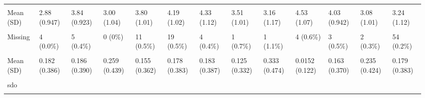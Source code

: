 \documentclass[
  single column]{article}
\begin{document}
\begin{landscape}
\begin{longtable}[t]{lllllllllllll}
\addlinespace
\cellcolor{gray!10}{rwa} & \cellcolor{gray!10}{} & \cellcolor{gray!10}{} & \cellcolor{gray!10}{} & \cellcolor{gray!10}{} & \cellcolor{gray!10}{} & \cellcolor{gray!10}{} & \cellcolor{gray!10}{} & \cellcolor{gray!10}{} & \cellcolor{gray!10}{} & \cellcolor{gray!10}{} & \cellcolor{gray!10}{} & \cellcolor{gray!10}{}\\
Mean (SD) & 2.88 (0.947) & 3.84 (0.923) & 3.00 (1.04) & 3.80 (1.01) & 4.19 (1.02) & 4.33 (1.12) & 3.51 (1.01) & 3.16 (1.17) & 4.53 (1.07) & 4.03 (0.942) & 3.08 (1.01) & 3.24 (1.12)\\
\cellcolor{gray!10}{Median [Min, Max]} & \cellcolor{gray!10}{2.83 [1.00, 7.00]} & \cellcolor{gray!10}{3.83 [1.00, 7.00]} & \cellcolor{gray!10}{2.82 [1.00, 6.50]} & \cellcolor{gray!10}{3.83 [1.00, 7.00]} & \cellcolor{gray!10}{4.17 [1.00, 7.00]} & \cellcolor{gray!10}{4.33 [1.00, 7.00]} & \cellcolor{gray!10}{3.50 [1.60, 5.50]} & \cellcolor{gray!10}{3.10 [1.00, 6.00]} & \cellcolor{gray!10}{4.50 [1.00, 7.00]} & \cellcolor{gray!10}{4.00 [1.00, 7.00]} & \cellcolor{gray!10}{3.00 [1.00, 7.00]} & \cellcolor{gray!10}{3.17 [1.00, 7.00]}\\
Missing & 4 (0.0\%) & 5 (0.4\%) & 0 (0\%) & 11 (0.5\%) & 19 (0.5\%) & 4 (0.4\%) & 1 (0.7\%) & 1 (1.1\%) & 4 (0.6\%) & 3 (0.5\%) & 2 (0.3\%) & 54 (0.2\%)\\
\cellcolor{gray!10}{sample\_frame\_opt\_in\_binary} & \cellcolor{gray!10}{} & \cellcolor{gray!10}{} & \cellcolor{gray!10}{} & \cellcolor{gray!10}{} & \cellcolor{gray!10}{} & \cellcolor{gray!10}{} & \cellcolor{gray!10}{} & \cellcolor{gray!10}{} & \cellcolor{gray!10}{} & \cellcolor{gray!10}{} & \cellcolor{gray!10}{} & \cellcolor{gray!10}{}\\
\addlinespace
Mean (SD) & 0.182 (0.386) & 0.186 (0.390) & 0.259 (0.439) & 0.155 (0.362) & 0.178 (0.383) & 0.183 (0.387) & 0.125 (0.332) & 0.333 (0.474) & 0.0152 (0.122) & 0.163 (0.370) & 0.235 (0.424) & 0.179 (0.383)\\
\cellcolor{gray!10}{Median [Min, Max]} & \cellcolor{gray!10}{0 [0, 1.00]} & \cellcolor{gray!10}{0 [0, 1.00]} & \cellcolor{gray!10}{0 [0, 1.00]} & \cellcolor{gray!10}{0 [0, 1.00]} & \cellcolor{gray!10}{0 [0, 1.00]} & \cellcolor{gray!10}{0 [0, 1.00]} & \cellcolor{gray!10}{0 [0, 1.00]} & \cellcolor{gray!10}{0 [0, 1.00]} & \cellcolor{gray!10}{0 [0, 1.00]} & \cellcolor{gray!10}{0 [0, 1.00]} & \cellcolor{gray!10}{0 [0, 1.00]} & \cellcolor{gray!10}{0 [0, 1.00]}\\
sdo &  &  &  &  &  &  &  &  &  &  &  & \\
\cellcolor{gray!10}{Mean (SD)} & \cellcolor{gray!10}{2.16 (0.963)} & \cellcolor{gray!10}{2.47 (0.986)} & \cellcolor{gray!10}{1.99 (0.960)} & \cellcolor{gray!10}{2.38 (0.969)} & \cellcolor{gray!10}{2.37 (0.966)} & \cellcolor{gray!10}{2.41 (0.943)} & \cellcolor{gray!10}{2.45 (1.03)} & \cellcolor{gray!10}{2.30 (1.15)} & \cellcolor{gray!10}{2.44 (0.896)} & \cellcolor{gray!10}{2.52 (0.987)} & \cellcolor{gray!10}{2.26 (1.02)} & \cellcolor{gray!10}{2.23 (0.973)}\\

\end{longtable}
\end{landscape}
\end{document}
